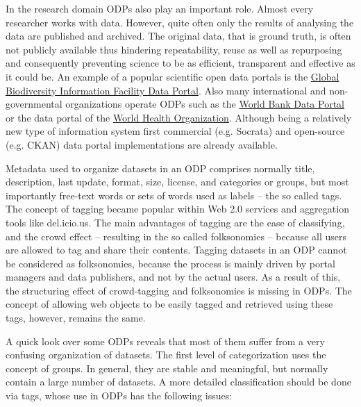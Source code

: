 In the research domain ODPs also play an important role.
Almost every researcher works with data. 
However, quite often only the results of analysing the data are published and archived. 
The original data, that is ground truth, is often not publicly available thus hindering repeatability, reuse as well as repurposing and consequently preventing science to be as efficient, transparent and effective as it could be. 
An example of a popular scientific open data portals is the \href{http://data.gbif.org}{Global Biodiversity Information Facility Data Portal}.
Also many international and non-governmental organizations operate ODPs such as the \href{http://data.worldbank.org}{World Bank Data Portal} or the data portal of the \href{http://apps.who.int/gho/data/}{World Health Organization}.
Although being a relatively new type of information system first commercial (e.g. Socrata) and open-source (e.g. CKAN) data portal implementations are already available.

Metadata used to organize datasets in an ODP comprises normally title, description, last update, format, size, license, and categories or groups, but most importantly free-text words or sets of words used as labels -- the so called tags.
The concept of tagging became popular within Web 2.0 services and aggregation tools like del.icio.us. 
The main advantages of tagging are the ease of classifying, and the crowd effect -- resulting in the so called folksonomies -- because all users are allowed to tag and share their contents. 
Tagging datasets in an ODP cannot be considered as folksonomies, because the process is mainly driven by portal managers and data publishers, and not by the actual users.
As a result of this, the structuring effect of crowd-tagging and folksonomies is missing in ODPs.
The concept of allowing web objects to be easily tagged and retrieved using these tags, however, remains the same.

A quick look over some ODPs reveals that most of them suffer from a very confusing organization of datasets. 
The first level of categorization uses the concept of groups.
In general, they are stable and meaningful, but normally contain a large number of datasets.
A more detailed classification should be done via tags, whose use in ODPs has the following issues:

